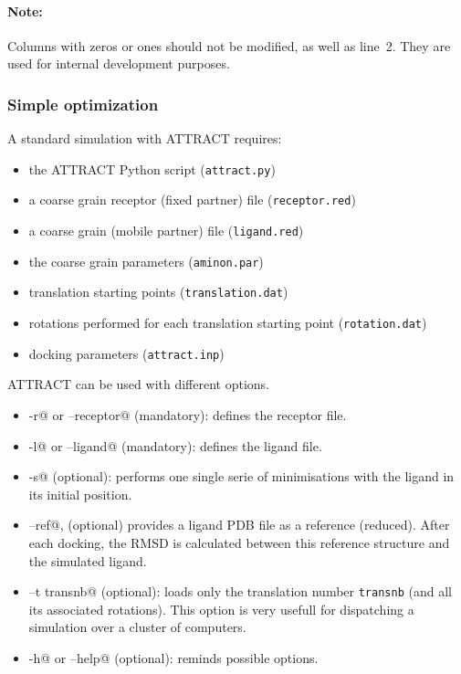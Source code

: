 \documentclass[12pt,a4paper]{article}
\begin{document}
\paragraph{Note:} Columns with zeros or ones should not be modified, as
well as line~2. They are used for internal development purposes.

\subsubsection{Simple optimization}

A standard simulation with ATTRACT requires:
\begin{itemize}
\item the ATTRACT Python script ({\tt  attract.py})
\item a coarse grain receptor (fixed partner) file ({\tt receptor.red})
\item a coarse grain (mobile partner) file ({\tt ligand.red})
\item the coarse grain parameters ({\tt aminon.par})
\item translation starting points ({\tt translation.dat})
\item rotations performed for each translation starting point ({\tt rotation.dat})
\item docking parameters ({\tt attract.inp})
\end{itemize}

ATTRACT can be used with different options.
\begin{itemize}
\item \verb@-r@ or \verb@--receptor@ (mandatory): defines the receptor file.
\item \verb@-l@ or \verb@--ligand@ (mandatory): defines the ligand file.
\item \verb@ -s@ (optional): performs one single serie of minimisations with the ligand in its initial position.
\item \verb@--ref@, (optional) provides a ligand PDB file as a reference (reduced). After each docking, the RMSD is calculated between this reference structure and the simulated ligand.
\item \verb@--t transnb@ (optional): loads only the translation number {\tt transnb} (and all its associated rotations). This option is very usefull for dispatching a simulation over a cluster of computers.
\item \verb@-h@ or \verb@--help@ (optional): reminds possible options.
\end{itemize}
\end{document}
